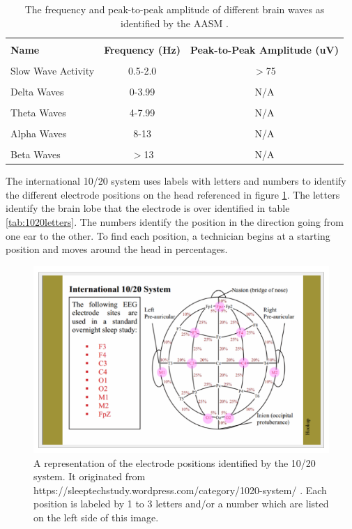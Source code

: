 \documentclass[12pt, oneside]{book}
\begin{document}
\begin{table}[H]
	{\hspace{0cm}
		\begin{tabular}{|p{5cm}|c|c|}
			\hline \\ [-1.5ex]
			\textbf{Name} & \textbf{Frequency (Hz)} & \textbf{Peak-to-Peak Amplitude (uV)} \\
			\hline \\ [-1.5ex]
			Slow Wave Activity & 0.5-2.0 & $>$75 \\
			\hline \\ [-1.5ex]
			Delta Waves & 0-3.99 & N/A \\
			\hline \\ [-1.5ex]
			Theta Waves & 4-7.99 & N/A \\
			\hline \\ [-1.5ex]
			Alpha Waves & 8-13 & N/A \\
			\hline \\ [-1.5ex]
			Beta Waves & $>$13 & N/A \\
			\hline
		\end{tabular}
	} 
\caption{The frequency and peak-to-peak amplitude of different brain waves as identified by the AASM \cite{berry_md_chair_aasm_nodate}.}
\label{tab:freq}
\end{table}

The international 10/20 system uses labels with letters and numbers to identify the different electrode positions on the head referenced in figure \ref{fig:1020}. The letters identify the brain lobe that the electrode is over identified in table \ref{tab:1020letters}. The numbers identify the position in the direction going from one ear to the other. To find each position, a technician begins at a starting position and moves around the head in percentages. \cite{noauthor_10/20_nodate} \cite{noauthor_10/20_nodate-1}


\begin{figure}[H]
	\centering
	\includegraphics[]{1020.png}
	\caption{A representation of the electrode positions identified by the 10/20 system. It originated from https://sleeptechstudy.wordpress.com/category/1020-system/ \cite{noauthor_10/20_nodate}. Each position is labeled by 1 to 3 letters and/or a number which are listed on the left side of this image.}
	\label{fig:1020}
\end{figure}
\end{document}
